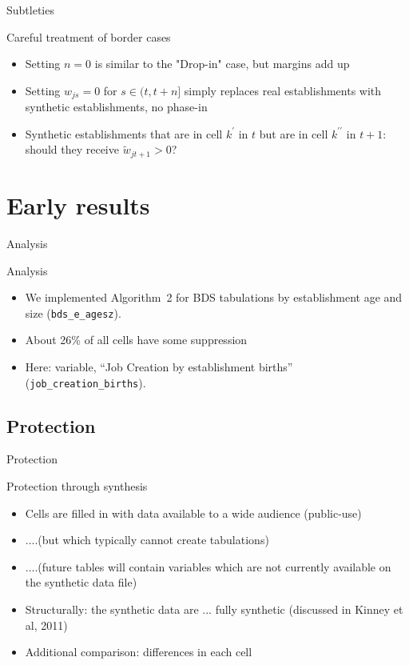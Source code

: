 \begin{frame}{Subtleties}

\begin{block}{Careful treatment of border cases}
\begin{itemize}
	\item Setting $n=0$ is similar to the "Drop-in" case, but margins add up
	\item Setting $w_{js} = 0$ for $s \in (t,t+n]$ simply replaces real establishments with synthetic establishments, no phase-in
	\item Synthetic establishments that are in cell $k^\prime$ in $t$ but are in cell $k^{\prime \prime}$ in $t+1$: should they receive $\tilde{w}_{jt+1}>0$?
\end{itemize}
\end{block}
\end{frame}



\section[Results]{Early results}


\begin{frame}{Analysis}
\begin{block}{Analysis}
\begin{itemize}[<+->]
\item We implemented Algorithm~2 for \ac{BDS} tabulations by \alert{establishment age and 
size} ({\tt bds\_e\_agesz}). 
\item About 26\% of all cells have some suppression
\item Here: variable, ``Job Creation by establishment births'' ({\tt job\_creation\_births}). 
\end{itemize}
\end{block}
\end{frame}

\subsection{Protection}
\begin{frame}{Protection}
\begin{block}{Protection through synthesis}
\begin{itemize}[<+->]
\item Cells are filled in with data available to a wide audience (public-use)
\item ....(but which typically cannot create tabulations)
\item ....(future tables will contain variables which are not currently available on the synthetic 
data file)
\item Structurally: the synthetic data are ... fully synthetic (discussed in Kinney et al, 2011)
\item Additional comparison: differences in each cell
\end{itemize}
\end{block}
\end{frame}


